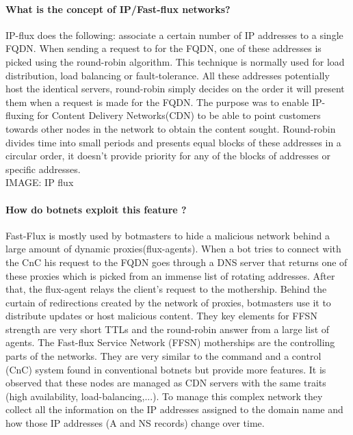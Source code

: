 \paragraph{What is the concept of IP/Fast-flux networks?} IP-flux does the following: associate a certain number of IP addresses to a single FQDN. When sending a request to for the FQDN, one of these addresses is picked using the round-robin algorithm. This technique is normally used for load distribution, load balancing or fault-tolerance. All these addresses potentially host the identical servers, round-robin simply decides on the order it will present them when a request is made for the FQDN. The purpose was to enable IP-fluxing for Content Delivery Networks(CDN) to be able to point customers towards other nodes in the network to obtain the content sought.\cite{robin_dns} Round-robin divides time into small periods and presents equal blocks of these addresses in a circular order, it doesn't provide priority for any of the blocks of addresses or specific addresses.\cite{robin}\\

IMAGE: IP flux

\paragraph{How do botnets exploit this feature ?}
Fast-Flux is mostly used by botmasters to hide a malicious network behind a large amount of dynamic proxies(flux-agents).\cite{ff1} When a bot tries to connect with the CnC his request to the FQDN goes through a DNS server that returns one of these proxies which is picked from an immense list of rotating addresses. After that, the flux-agent relays the client's request to the mothership.\cite{wiki_ff} Behind the curtain of redirections created by the network of proxies, botmasters use it to distribute updates or host malicious content. They key elements for FFSN strength are very short TTLs and the round-robin answer from a large list of agents\cite{hybrid}\cite{tracking2}.
The Fast-flux Service Network (FFSN) motherships are the controlling parts of the networks. They are very similar to the command and a control (CnC) system found in conventional botnets but provide more features. It is observed that these nodes are managed as CDN servers with the same traits (high availability, load-balancing,...). To manage this complex network they collect all the information on the IP addresses assigned to the domain name and how those IP addresses (A and NS records) change over time.\cite{bot-com}

